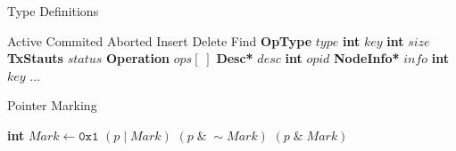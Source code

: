 \documentclass[10pt,conference,compsocconf]{IEEEtran}
\begin{document}
\begin{algorithm}[h]
    \caption{Type Definitions}
    \label{alg:nodestructure}
    \vspace{-0.2in}
    \begin{multicols}{2}
        \begin{algorithmic}[1]
            \State Active
            \State Commited
            \State Aborted
            \EndEnum
            \State Insert
            \State Delete
            \State Find
            \EndEnum
            \State \textbf{OpType} $type$
            \State \textbf{int} $key$
            \EndStruct
            \State \textbf{int} $size$
            \State \textbf{TxStauts} $status$
            \State \textbf{Operation} $ops[\;]$
            \EndStruct
            \State \textbf{Desc*} $desc$
            \State \textbf{int} $opid$
            \EndStruct
            \State \textbf{NodeInfo*} $info$
            \State \textbf{int} $key$
            \State ...
            \EndStruct
            \end{algorithmic}
    \end{multicols}
    \vspace{-0.15in}
\end{algorithm}

\begin{algorithm}[h]
    \caption{Pointer Marking}
    \label{alg:pointermarking}
    \begin{algorithmic}[1]
        \State \textbf{int} $Mark \gets \texttt{0x1}$
         $(p\;|\;Mark)$
        \EndDefine
         $(p\;\&\;\sim Mark)$
        \EndDefine
         $(p\;\&\;Mark)$
        \EndDefine
    \end{algorithmic}
\end{algorithm}


\end{document}
